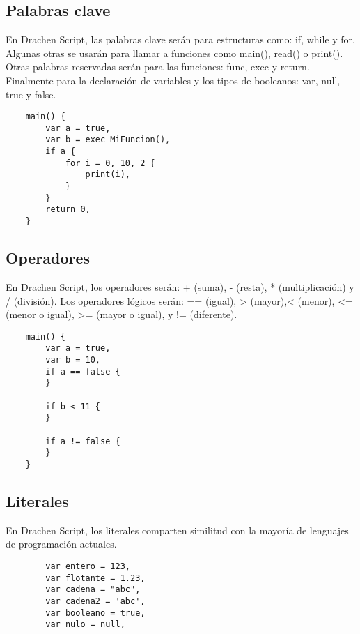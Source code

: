 \documentclass[https://www.overleaf.com/project/63761df255a8a9f4a15c3579
	letterpaper, %
	10pt, %
]{CSUniSchoolLabReport}
\begin{document}
    \subsection{Palabras clave}
    En Drachen Script, las palabras clave serán para estructuras como: if, while y for. Algunas otras se usarán para llamar a funciones como main(), read() o print(). Otras palabras reservadas serán para las funciones: func, exec y return. Finalmente para la declaración de variables y los tipos de booleanos: var, null, true y false. \\
    
    \begin{lstlisting}
    main() {
        var a = true,
        var b = exec MiFuncion(),
        if a {
            for i = 0, 10, 2 {
                print(i),
            }
        }
        return 0,
    }
    \end{lstlisting}
    
    \subsection{Operadores}
    En Drachen Script, los operadores serán: + (suma), - (resta), * (multiplicación) y / (división).
    Los operadores lógicos serán: == (igual), > (mayor),< (menor), <= (menor o igual), >= (mayor o igual), y != (diferente).\\
    
    \begin{lstlisting}
    main() {
        var a = true,
        var b = 10,
        if a == false {
        }
    
        if b < 11 {
        } 
    
        if a != false {
        }
    }
    \end{lstlisting}
    
    \subsection{Literales}
    En Drachen Script, los literales comparten similitud con la mayoría de lenguajes de programación actuales. \\
    
    \begin{lstlisting}
        var entero = 123,
        var flotante = 1.23,
        var cadena = "abc",
        var cadena2 = 'abc',
        var booleano = true,
        var nulo = null,
    \end{lstlisting}
    
\end{document}
